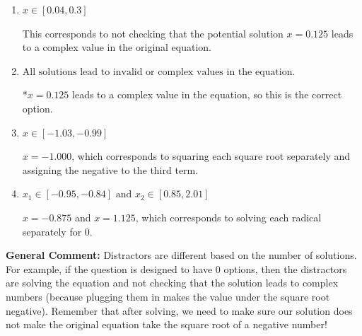 \documentclass{extbook}[14pt]
\begin{document}
\begin{enumerate}
{\begin{enumerate}[label=\Alph*.]
$x = -0.875$ and $x = 0.125$, which corresponds to solving the equation correctly and including the value that makes the first square root 0.
\item \( x \in [0.04,0.3] \)

This corresponds to not checking that the potential solution $x = 0.125$ leads to a complex value in the original equation.
\item \( \text{All solutions lead to invalid or complex values in the equation.} \)

*$x = 0.125$ leads to a complex value in the equation, so this is the correct option.
\item \( x \in [-1.03,-0.99] \)

$x = -1.000$, which corresponds to squaring each square root separately and assigning the negative to the third term.
\item \( x_1 \in [-0.95, -0.84] \text{ and } x_2 \in [0.85,2.01] \)

$x = -0.875$ and $x = 1.125$, which corresponds to solving each radical separately for 0.
\end{enumerate}

\textbf{General Comment:} Distractors are different based on the number of solutions. For example, if the question is designed to have 0 options, then the distractors are solving the equation and not checking that the solution leads to complex numbers (because plugging them in makes the value under the square root negative). Remember that after solving, we need to make sure our solution does not make the original equation take the square root of a negative number!
}
\end{enumerate}
\end{document}
